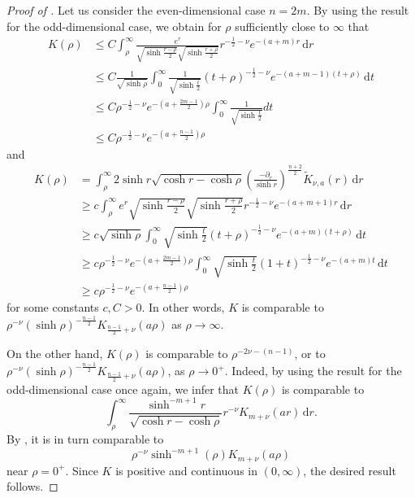 \documentclass[11pt]{amsart}
\theoremstyle{plain}
\theoremstyle{definition}
\numberwithin{equation}{section}
\begin{document}
\begin{proof}[Proof of ]
Let us consider the even-dimensional case $n=2m$. By using the result for the odd-dimensional case, we obtain for $\rho$ sufficiently close to $\infty$ that
\begin{align*}
K(\rho)
&\le C \int_\rho^\infty \frac{e^r}{\sqrt{\sinh \frac{r-\rho}{2}} \sqrt{\sinh \frac{r+\rho}{2}}} r^{-\frac{1}{2}-\nu} e^{-(a+m) r} \,\mathrm{d}r \\
& \le C \frac{1}{\sqrt{\sinh \rho}}\int _0^\infty \frac{1}{\sqrt{\sinh \frac{t}{2}}} (t+\rho)^{-\frac{1}{2}-\nu} e^{-(a+m-1)(t+\rho)} \,\mathrm{d}t \\
& \le C \rho^{-\frac{1}{2}-\nu} e^{-(a+\frac{2m-1}{2})\rho} \int_0^\infty \frac{1}{\sqrt{\sinh \frac{t}{2}}} dt \\
&\leq C \rho^{-\frac{1}{2}-\nu} e^{-(a+\frac{n-1}{2})\rho}
\end{align*}
and
\begin{align*}
K(\rho)
&= \int_\rho^\infty 2\sinh r \sqrt{\cosh r - \cosh \rho} \left(\frac{-\partial_r}{\sinh r} \right)^{\frac{n+2}{2}} \widetilde{K}_{\nu, a}(r) \,\mathrm{d}r \\
& \ge c \int_\rho^\infty e^r\sqrt{\sinh \frac{r-\rho}{2}} \sqrt{\sinh \frac{r+\rho}{2}} r^{-\frac{1}{2}-\nu} e^{-(a+m+1) r} \,\mathrm{d}r \\
& \ge c \sqrt{\sinh \rho} \int_0^\infty \sqrt{\sinh \frac{t}{2}} (t+\rho)^{-\frac{1}{2}-\nu} e^{-(a+m)(t+\rho)} \,\mathrm{d}t \\
& \ge c \rho^{-\frac{1}{2}-\nu} e^{-(a+\frac{2m-1}{2})\rho} \int _0 ^\infty \sqrt{\sinh \frac{t}{2}} (1+t)^{-\frac{1}{2}-\nu}e^{-(a+m)t} \,\mathrm{d}t \\
&\geq c \rho^{-\frac{1}{2}-\nu} e^{-(a+\frac{n-1}{2})\rho}
  \end{align*}
for some constants $c, C>0$. In other words, $K$ is comparable to $\rho^{-\nu} (\sinh\rho)^{-\frac{n-1}{2}} K_{\frac{n-1}{2}+\nu}(a\rho)$ as $\rho \to \infty$.

On the other hand, $K(\rho)$ is comparable to $\rho^{-2\nu-(n-1)}$, or to $\rho^{-\nu} (\sinh\rho)^{-\frac{n-1}{2}} K_{\frac{n-1}{2}+\nu}(a\rho)$, as $\rho \to 0^+$. Indeed, by using the result for the odd-dimensional case once again, we infer that $K(\rho)$ is comparable to
\begin{equation*}
\int_\rho^\infty \frac{\sinh^{-m+1} r}{\sqrt{\cosh r - \cosh \rho}} r^{-\nu}K_{m+\nu}(ar) \,\mathrm{d}r.
\end{equation*}
By , it is in turn comparable to
\begin{equation*}
\rho^{-\nu} \sinh^{-m+1}(\rho) K_{m+\nu}(a\rho)
\end{equation*}
near $\rho=0^+$. Since $K$ is positive and continuous in $(0, \infty)$, the desired result follows.
\end{proof}
\end{document}
